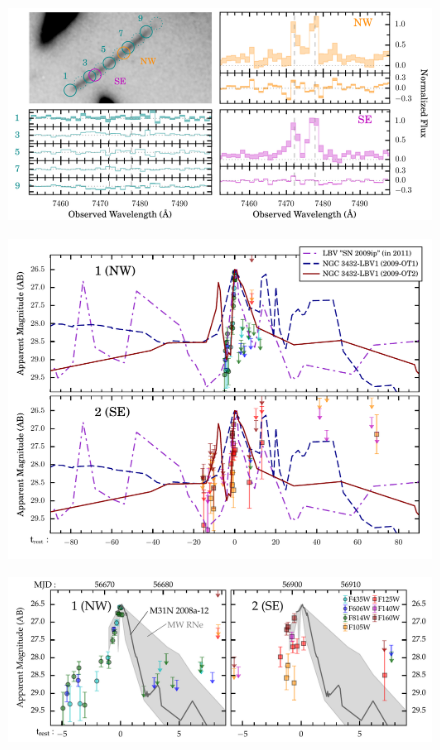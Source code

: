 \begin{supplementary}
\begin{figure}[tbp]
  \begin{center}
    \includegraphics[width=\textwidth]{muse_oii_sequence}
    \caption{\protect}
  \end{center}
\end{figure}

\begin{figure}[tbp]
  \begin{center}
    \includegraphics[width=\textwidth]{lbv_lightcurve_comparison}
    \caption{\protect}
  \end{center}
\end{figure}

\begin{figure}[tbp]
  \begin{center}
    \includegraphics[width=\textwidth]{recurrent_nova_lightcurve_comparison}
    \caption{\protect}
  \end{center}
\end{figure}


\end{supplementary}
